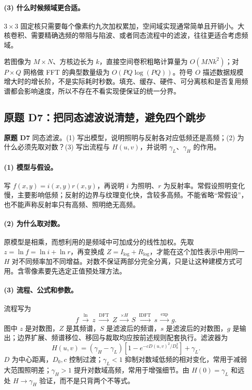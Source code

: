 \paragraph{(3) 什么时候频域更合适。}
$3\times3$ 固定核只需要每个像素约九次加权累加，空间域实现通常简单且开销小。大核卷积、需要精确选频的带阻与陷波、或者同态流程中的滤波，往往更适合考虑频域。

若图像为 $M\times N$、方核边长为 $k$，直接空间卷积粗略计算量为 $O(MNk^2)$；对 $P\times Q$ 网格做 FFT 的典型数量级为 $O(PQ\log(PQ))$。符号 $O$ 描述数据规模增大时的增长阶，不是实际耗时秒数。填充、缓存、硬件、可分离核和是否复用频谱都会影响速度，所以不存在不看实现便保证的统一分界。

\subsection{原题 D7：把同态滤波说清楚，避免四个跳步}
\label{original:D7}

\noindent\textbf{原题 D7}\quad
同态滤波。(1) 写出模型，说明照明与反射各对应低频还是高频；(2) 为什么必须先取对数？(3) 写出流程与 $H(u,v)$，并说明 $\gamma_L$、$\gamma_H$ 的作用。

\paragraph{(1) 模型与假设。}
写 $f(x,y)=i(x,y)r(x,y)$，再说明 $i$ 为照明、$r$ 为反射率。常假设照明变化慢，主要影响低频；反射的边界与纹理变化快，含较多高频。不能省略“常假设”，也不能声称反射率只有高频、照明绝无高频。

\paragraph{(2) 为什么取对数。}
原模型是相乘，而想利用的是频域中可加成分的线性加权。先取 $z=\ln f=\ln i+\ln r$，再变换成 $Z=I_{\log}+R_{\log}$，才能在这个加性表示中用同一 $H$ 对不同频率加不同增益。对数不保证两部分完全分离，只是让这种建模方式可用。含零像素要先选定正值预处理方法。

\paragraph{(3) 流程、公式和参数。}
流程写为
\[
f\ \xrightarrow{\ln}\ z\ \xrightarrow{\mathrm{DFT}}\ Z
\ \xrightarrow{\times H}\ S\ \xrightarrow{\mathrm{IDFT}}\ s
\ \xrightarrow{\exp}\ g.
\]
图中 $z$ 是对数图，$Z$ 是其频谱，$S$ 是滤波后的频谱，$s$ 是滤波后的对数图，$g$ 是输出；边界扩展、频谱移位、移回与裁取均应按前述规则配套执行。滤波器为
\[
H(u,v)=(\gamma_H-\gamma_L)
\left[1-e^{-cD(u,v)^2/D_0^2}\right]+\gamma_L.
\]
$D$ 为中心距离，$D_0,c$ 控制过渡；$\gamma_L<1$ 抑制对数域低频的相对变化，常用于减弱大范围照明差；$\gamma_H>1$ 提升对数域高频，常用于增强细节。由 $H(0)=\gamma_L$ 和远处 $H\to\gamma_H$ 验证，而不是只背两个不等式。

